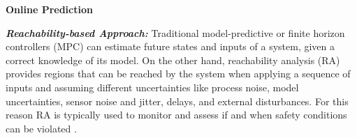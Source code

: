 %


\vspace{10pt}
\noindent\textbf{Online Prediction}

\noindent\textbf{\em Reachability-based Approach:} Traditional model-predictive or finite horizon controllers (MPC) \cite{bernardini2012stabilizing, elnaggar17AHS, bezzo2016stochastic} can estimate future states and inputs of a system, given a correct knowledge of its model. On the other hand, reachability analysis (RA) \cite{TomlinRAM11, TomlinICRA11, esen18} provides regions that can be reached by the system when applying a sequence of inputs and assuming different uncertainties like process noise, model uncertainties, sensor noise and jitter, delays, and external disturbances. For this reason RA is typically used to monitor and assess if and when safety conditions can be violated \cite{gillula2011applications, gillula2010design, althoff2010reachability}.

